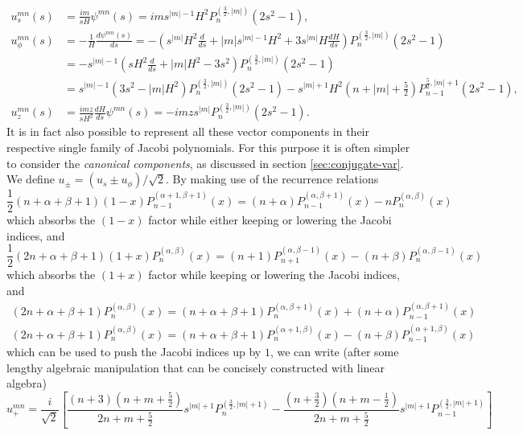 \begin{equation}
\begin{aligned}
    u_s^{mn}(s) &= \frac{im}{sH} \psi^{mn}(s) = im s^{|m|-1} H^2 P_n^{(\frac{3}{2}, |m|)}(2s^2 - 1), \\ 
    u_\phi^{mn}(s) &= - \frac{1}{H} \frac{d\psi^{mn}(s)}{ds} = - \left(s^{|m|}H^2 \frac{d}{ds} + |m|s^{|m|-1} H^2 + 3s^{|m|}H \frac{dH}{ds}\right) P_n^{(\frac{3}{2},|m|)}(2s^2 - 1) \\ 
    &= -s^{|m|-1} \left(sH^2 \frac{d}{ds} + |m| H^2 - 3s^2\right) P_n^{(\frac{3}{2}, |m|)}(2s^2 -1) \\ 
    &= s^{|m|-1} \left(3s^2 - |m|H^2\right) P_n^{(\frac{3}{2}, |m|)}(2s^2 - 1) - s^{|m|+1}H^2\left(n + |m| + \frac{5}{2}\right) P_{n-1}^{\frac{5}{2},|m|+1}(2s^2 - 1), \\ 
    u_z^{mn}(s) &= \frac{imz}{sH^2} \frac{dH}{ds} \psi^{mn}(s) = - imz s^{|m|} P_n^{(\frac{3}{2}, |m|)}(2s^2 - 1).
\end{aligned}
\end{equation}
%
It is in fact also possible to represent all these vector components in their respective single family of Jacobi polynomials. For this purpose it is often simpler to consider the \textit{canonical components}, as discussed in section \ref{sec:conjugate-var}. We define $u_\pm = (u_s \pm u_\phi)/\sqrt{2}$. By making use of the recurrence relations
%
\[
    \frac{1}{2}(n + \alpha + \beta + 1) (1 - x) P_{n-1}^{(\alpha + 1, \beta + 1)}(x) = (n + \alpha) P_{n-1}^{(\alpha, \beta + 1)}(x) - n P_n^{(\alpha, \beta)}(x)
\]
%
which absorbs the $(1 - x)$ factor while either keeping or lowering the Jacobi indices, and
%
\[
    \frac{1}{2}(2n + \alpha + \beta + 1) (1 + x) P_{n}^{(\alpha, \beta)}(x) = (n + 1) P_{n+1}^{(\alpha, \beta - 1)}(x) - (n + \beta) P_n^{(\alpha, \beta-1)}(x)
\]
%
which absorbs the $(1 + x)$ factor while keeping or lowering the Jacobi indices, and
%
\[
\begin{aligned}
    (2n + \alpha + \beta + 1) P_n^{(\alpha, \beta)}(x) = (n + \alpha + \beta + 1) P_{n}^{(\alpha, \beta + 1)}(x) + (n + \alpha) P_{n-1}^{(\alpha, \beta + 1)}(x) \\ 
    (2n + \alpha + \beta + 1) P_n^{(\alpha, \beta)}(x) = (n + \alpha + \beta + 1) P_{n}^{(\alpha + 1, \beta)}(x) - (n + \beta) P_{n-1}^{(\alpha + 1, \beta)}(x)
\end{aligned}
\]
%
which can be used to push the Jacobi indices up by $1$, we can write (after some lengthy algebraic manipulation that can be concisely constructed with linear algebra)
%
\begin{equation}
    u_+^{mn} = \frac{i}{\sqrt{2}} \left[\frac{(n+3)(n + m + \frac{5}{2})}{2n + m + \frac{5}{2}} s^{|m|+1} P_n^{(\frac{3}{2}, |m|+1)} - \frac{(n+\frac{3}{2})(n + m - \frac{1}{2})}{2n + m + \frac{5}{2}} s^{|m|+1} P_{n-1}^{(\frac{3}{2}, |m|+1)}\right]
\end{equation}

